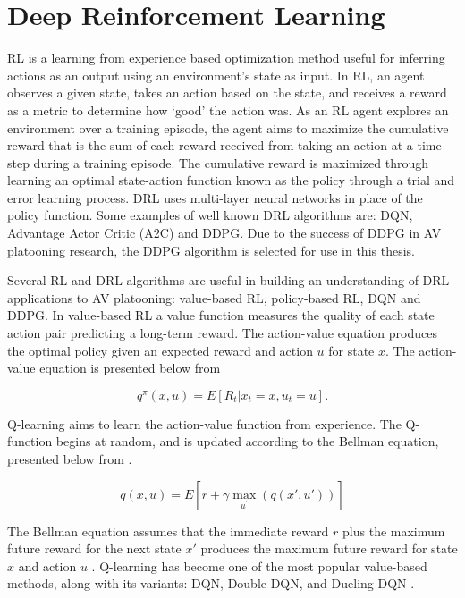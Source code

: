 \section{Deep Reinforcement Learning}
RL is a learning from experience based optimization method useful for inferring actions as
an output using an environment's state as input. In RL, an agent observes a given state,
takes an action based on the state, and receives a reward as a metric to determine how
`good' the action was.  As an RL agent explores an environment over a training episode,
the agent aims to maximize the cumulative reward that is the sum of each reward received
from taking an action at a time-step during a training episode.  The cumulative reward
is maximized through learning an optimal state-action function known as the policy through
a trial and error learning process.  DRL uses multi-layer neural networks in place of the
policy function.  Some examples of well known DRL algorithms are: DQN, Advantage Actor
Critic (A2C) and DDPG. Due to the success of DDPG in AV platooning research, the DDPG
algorithm is selected for use in this thesis.

Several RL and DRL algorithms are useful in building an understanding of DRL applications
to AV platooning: value-based RL, policy-based RL, DQN and DDPG. In value-based RL a value
function measures the quality of each state action pair predicting a long-term reward. The
action-value equation produces the optimal policy given an expected reward and action $u$
for state $x$. The action-value equation is presented below
from \cite{sutton2018reinforcement}

\begin{equation}
    q^{\pi}(x,u) = E[R_t|x_t = x, u_t = u]. \label{eqn:act_val}
\end{equation}

Q-learning aims to learn the action-value function from experience. The Q-function begins at
random, and is updated according to the Bellman equation, presented below from
\cite{sutton2018reinforcement}.

\begin{equation}
    q(x,u) = E[r + \gamma\max_{u^{'}}(q(x', u'))] \label{eqn:bell}
\end{equation}

\noindent The Bellman equation assumes that the immediate reward $r$ plus the maximum
future reward for the next state $x'$ produces the maximum future reward for state $x$
and action $u$ \cite{Zhu2018}.  Q-learning has become one of the most popular value-based
methods, along with its variants: DQN, Double DQN, and Dueling DQN \cite{sWang2017}.

